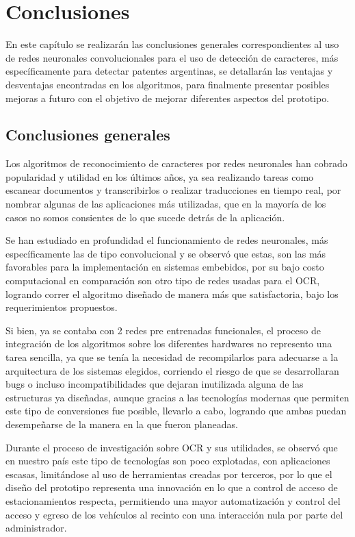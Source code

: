 \chapter{Conclusiones}
En este capítulo se realizarán las conclusiones generales correspondientes al uso de redes neuronales convolucionales para el uso de detección de caracteres, más específicamente para detectar patentes argentinas, se detallarán las ventajas y desventajas encontradas en los algoritmos, para finalmente presentar posibles mejoras a futuro con el objetivo de mejorar diferentes aspectos del prototipo.

\section{Conclusiones generales}
Los algoritmos de reconocimiento de caracteres por redes neuronales han cobrado popularidad y utilidad en los últimos años, ya sea realizando tareas como escanear documentos y transcribirlos o realizar traducciones en tiempo real, por nombrar algunas de las aplicaciones más utilizadas, que en la mayoría de los casos no somos consientes de lo que sucede detrás de la aplicación.

Se han estudiado en profundidad el funcionamiento de redes neuronales, más específicamente las de tipo convolucional y se observó que estas, son las más favorables para la implementación en sistemas embebidos, por su bajo costo computacional en comparación son otro tipo de redes usadas para el OCR, logrando correr el algoritmo diseñado de manera más que satisfactoria, bajo los requerimientos propuestos.

Si bien, ya se contaba con 2 redes pre entrenadas funcionales, el proceso de integración de los algoritmos sobre los diferentes hardwares no represento una tarea sencilla, ya que se tenía la necesidad de recompilarlos para adecuarse a la arquitectura de los sistemas elegidos, corriendo el riesgo de que se desarrollaran bugs o incluso incompatibilidades que dejaran inutilizada alguna de las estructuras ya diseñadas, aunque gracias a las tecnologías modernas que permiten este tipo de conversiones fue posible, llevarlo a cabo, logrando que ambas puedan desempeñarse de la manera en la que fueron planeadas.

Durante el proceso de investigación sobre OCR y sus utilidades, se observó que en nuestro país este tipo de tecnologías son poco explotadas, con aplicaciones escasas, limitándose al uso de herramientas creadas por terceros, por lo que el diseño del prototipo representa una innovación en lo que a control de acceso de estacionamientos respecta, permitiendo una mayor automatización y control del acceso y egreso de los vehículos al recinto con una interacción nula por parte del administrador. 

